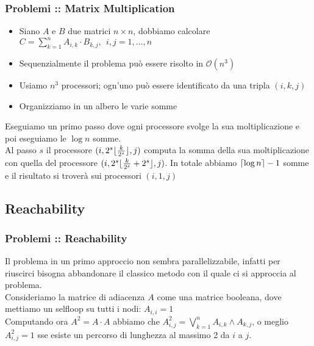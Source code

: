 \documentclass{beamer}
\newcommand{\bigO}{\ensuremath{\mathcal{O}}} %
\DeclarePairedDelimiter{\ceil}{\lceil}{\rceil} %
\DeclarePairedDelimiter{\floor}{\lfloor}{\rfloor} %
\begin{document}
\begin{frame}
\frametitle{Problemi :: Matrix Multiplication} %
\begin{itemize}
	\item Siano $A$ e $B$ due matrici $n \times n$, dobbiamo calcolare $C = \sum_{k=1}^{n}A_{i,k}\cdot B_{k,j},\ \ i,j=1,\dots,n$
	\item Sequenzialmente il problema può essere risolto in $\bigO{(n^3)}$
	\item Usiamo $n^3$ processori; ogn'uno può essere identificato da una tripla $(i,k,j)$
	\item Organizziamo in un albero le varie somme
\end{itemize}
Eseguiamo un primo passo dove ogni processore svolge la sua moltiplicazione e poi eseguiamo le $\log n$ somme.\\
Al passo $s$ il processore $(i,2^s \floor{ \frac{k}{2^s} },j)$ computa la somma della sua moltiplicazione con quella del processore $(i,2^s \floor{ \frac{k}{2^s} + 2^s},j)$.
In totale abbiamo $\ceil{\log n} - 1$ somme e il risultato si troverà sui processori $(i,1,j)$

\end{frame}

\subsection{Reachability}

\begin{frame}
	\frametitle{Problemi :: Reachability} %
	Il problema in un primo approccio non sembra parallelizzabile, infatti per riuscirci bisogna abbandonare il classico metodo con il quale ci si approccia al problema.\\
	Consideriamo la matrice di adiacenza $A$ come una matrice booleana, dove mettiamo un selfloop su tutti i nodi: $A_{i,i} = 1$\\
	Computando ora $A^2 = A\cdot A$ abbiamo che $A_{i,j}^2 = \bigvee_{k=1}^n A_{i,k} \wedge A_{k,j}$, o meglio $A^2_{i,j} = 1 $ sse esiste un percorso di lunghezza al massimo 2 da $i$ a $j$.\\
		
\end{frame}
\end{document}
